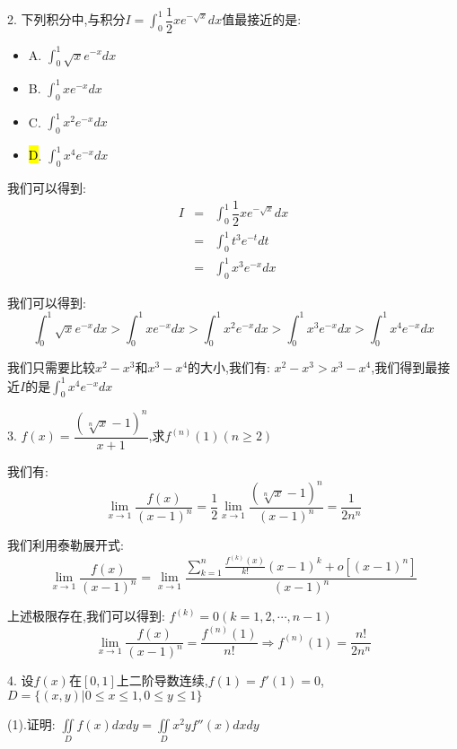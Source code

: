 2. 下列积分中,与积分$I=\int_{0}^{1}\dfrac{1}{2}xe^{-\sqrt{x}}dx$值最接近的是:  
\begin{itemize}
	\item A. $\int_{0}^{1}\sqrt{x}e^{-x}dx$
	\item B. $\int_{0}^{1}xe^{-x}dx$
	\item C. $\int_{0}^{1}x^2e^{-x}dx$
	\item \hl{D}. $\int_{0}^{1}x^4e^{-x}dx$
\end{itemize}
\begin{solution}

	我们可以得到:  
	\begin{eqnarray*}
		I&=&\int_{0}^{1}\dfrac{1}{2}xe^{-\sqrt{x}}dx\\
		&=&\int_{0}^{1}t^3e^{-t}dt\\
		&=&\int_{0}^{1}x^3e^{-x}dx
	\end{eqnarray*}
	
	我们可以得到:  
	$$\int_{0}^{1}\sqrt{x}e^{-x}dx>\int_{0}^{1}xe^{-x}dx>\int_{0}^{1}x^2e^{-x}dx>\int_{0}^{1}x^3e^{-x}dx>\int_{0}^{1}x^4e^{-x}dx$$
	
	我们只需要比较$x^2-x^3$和$x^3-x^4$的大小,我们有:  $x^2-x^3>x^3-x^4$,我们得到最接近$I$的是$\int_{0}^{1}x^4e^{-x}dx$
\end{solution}

3. $f(x)=\dfrac{\left(\sqrt[n]{x}-1\right) ^n}{x+1}$,求$f^{(n)}(1)(n\geq 2)$
\begin{solution}

	我们有:  $$\lim\limits_{x\rightarrow 1}\dfrac{f(x)}{(x-1)^n}=\dfrac{1}{2}\lim\limits_{x\rightarrow 1}\dfrac{(\sqrt[n]{x}-1)^n}{(x-1)^n}=\dfrac{1}{2n^{n}}$$
	
	我们利用泰勒展开式:  
	$$\lim\limits_{x\rightarrow 1}\dfrac{f(x)}{(x-1)^n}=\lim\limits_{x\rightarrow 1}\dfrac{\sum\limits_{k=1}^{n}\frac{f^{(k)}(x)}{k!}(x-1)^k+o[(x-1)^n]}{(x-1)^n}$$
	
	上述极限存在,我们可以得到:  $f^{(k)}=0(k=1,2,\cdots,n-1)$
	$$\lim\limits_{x\rightarrow 1}\dfrac{f(x)}{(x-1)^n}=\dfrac{f^{(n)}(1)}{n!}\Rightarrow f^{(n)}(1)=\dfrac{n!}{2n^{n}}$$
\end{solution}

4. 设$f(x)$在$[0,1]$上二阶导数连续,$f(1)=f'(1)=0$,$D=\{(x,y)|0\leq x\leq 1,0\leq y\leq 1\}$

(1).证明:  $\iint\limits_{D}f(x)dxdy=\iint\limits_{D}x^2yf''(x)dxdy$

